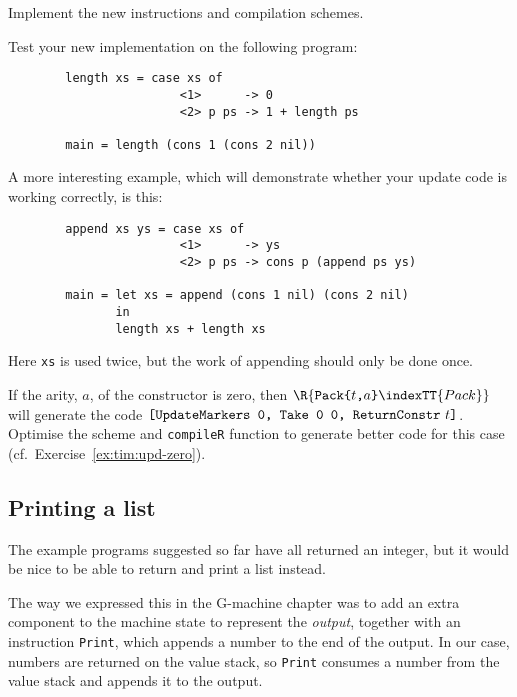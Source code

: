 \begin{exercise}
Implement the new instructions and compilation schemes.

Test your new implementation on the following program:
\begin{verbatim}
        length xs = case xs of
                        <1>      -> 0
                        <2> p ps -> 1 + length ps

        main = length (cons 1 (cons 2 nil))
\end{verbatim}
A more interesting example, which will demonstrate whether your
update code is working correctly, is this:
\begin{verbatim}
        append xs ys = case xs of
                        <1>      -> ys
                        <2> p ps -> cons p (append ps ys)

        main = let xs = append (cons 1 nil) (cons 2 nil)
               in
               length xs + length xs
\end{verbatim}
Here \mbox{\tt xs} is used twice, but the work of appending should
only be done once.
\end{exercise}

\begin{exercise}
If the arity, $a$, of the constructor is zero, then $\R{\mbox{\tt Pack{\char'173}}t\mbox{\tt ,}a\mbox{\tt {\char'175}}\indexTT{Pack}}$ will
generate the code $\mbox{\tt [UpdateMarkers\ 0,\ Take\ 0\ 0,\ ReturnConstr}~t\mbox{\tt ]}$.  Optimise
the \tR{} scheme and \mbox{\tt compileR} function to generate better code for this case
(cf.\ Exercise~\ref{ex:tim:upd-zero}).
\end{exercise}

\subsection{Printing a list}
\label{sect:tim:print-list}

The example programs suggested so far have all returned an integer,
but it would be nice to be able to return and print a list instead.

The way we expressed this in the G-machine chapter was to add an extra
component to the machine state to represent the {\em output}, together with
an instruction \mbox{\tt Print}, which appends a number to the end of the output.
In our case, numbers are returned on the value stack, so \mbox{\tt Print} consumes
a number from the value stack and appends it to the output.

